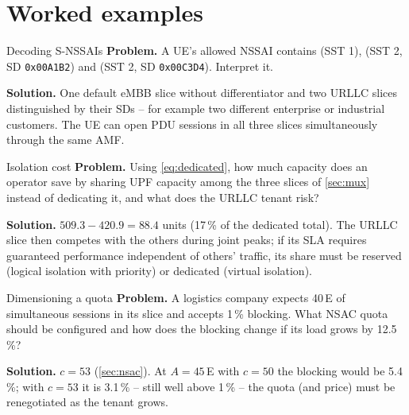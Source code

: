\documentclass[11pt,a4paper]{article}
\begin{document}
\section{Worked examples}

\begin{examplebox}{Decoding S-NSSAIs}\label{ex:snssai}
\textbf{Problem.} A UE's allowed NSSAI contains (SST 1), (SST 2, SD \texttt{0x00A1B2}) and (SST 2, SD \texttt{0x00C3D4}). Interpret it.

\textbf{Solution.} One default eMBB slice without differentiator and two URLLC slices distinguished by their SDs -- for example two different
enterprise or industrial customers. The UE can open PDU sessions in all three slices simultaneously through the same AMF.
\end{examplebox}

\begin{examplebox}{Isolation cost}\label{ex:mux}
\textbf{Problem.} Using \cref{eq:dedicated}, how much capacity does an operator save by sharing UPF capacity among the three slices of \cref{sec:mux}
instead of dedicating it, and what does the URLLC tenant risk?

\textbf{Solution.} $509.3 - 420.9 = 88.4$ units (17\,\% of the dedicated total). The URLLC slice then competes with the others during joint
peaks; if its SLA requires guaranteed performance independent of others' traffic, its share must be reserved (logical isolation with
priority) or dedicated (virtual isolation).
\end{examplebox}

\begin{examplebox}{Dimensioning a quota}\label{ex:nsac}
\textbf{Problem.} A logistics company expects 40\,E of simultaneous sessions in its slice and accepts 1\,\% blocking. What NSAC quota should be
configured and how does the blocking change if its load grows by 12.5\,\%?

\textbf{Solution.} $c = 53$ (\cref{sec:nsac}). At $A = 45$\,E with $c = 50$ the blocking would be 5.4\,\%; with $c = 53$ it is 3.1\,\% -- still well above
1\,\% -- the quota (and price) must be renegotiated as the tenant grows.
\end{examplebox}

\end{document}
